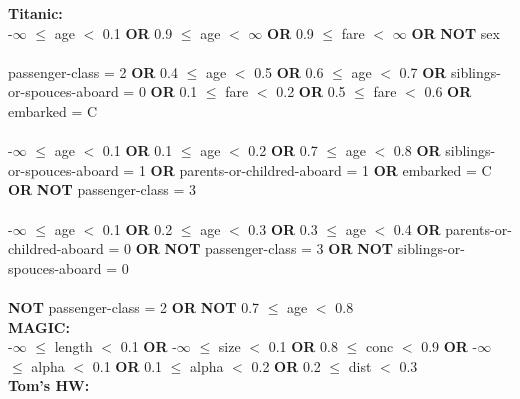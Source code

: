 \noindent \textbf{ Titanic: }\\

\noindent -$\infty$ $\le$ age $<$ 0.1 \textbf{OR} 0.9 $\le$ age $<$ $\infty$ \textbf{OR} 0.9 $\le$ fare $<$ $\infty$ \textbf{OR}  \textbf{NOT} sex \\\\passenger-class = 2 \textbf{OR} 0.4 $\le$ age $<$ 0.5 \textbf{OR} 0.6 $\le$ age $<$ 0.7 \textbf{OR} siblings-or-spouces-aboard = 0 \textbf{OR} 0.1 $\le$ fare $<$ 0.2 \textbf{OR} 0.5 $\le$ fare $<$ 0.6 \textbf{OR} embarked = C \\\\-$\infty$ $\le$ age $<$ 0.1 \textbf{OR} 0.1 $\le$ age $<$ 0.2 \textbf{OR} 0.7 $\le$ age $<$ 0.8 \textbf{OR} siblings-or-spouces-aboard = 1 \textbf{OR} parents-or-childred-aboard = 1 \textbf{OR} embarked = C \textbf{OR}  \textbf{NOT} passenger-class = 3 \\\\-$\infty$ $\le$ age $<$ 0.1 \textbf{OR} 0.2 $\le$ age $<$ 0.3 \textbf{OR} 0.3 $\le$ age $<$ 0.4 \textbf{OR} parents-or-childred-aboard = 0 \textbf{OR}  \textbf{NOT} passenger-class = 3 \textbf{OR}  \textbf{NOT} siblings-or-spouces-aboard = 0 \\\\ \textbf{NOT} passenger-class = 2 \textbf{OR}  \textbf{NOT} 0.7 $\le$ age $<$ 0.8 \\

\noindent \textbf{ MAGIC: }\\

\noindent -$\infty$ $\le$ length $<$ 0.1 \textbf{OR} -$\infty$ $\le$ size $<$ 0.1 \textbf{OR} 0.8 $\le$ conc $<$ 0.9 \textbf{OR} -$\infty$ $\le$ alpha $<$ 0.1 \textbf{OR} 0.1 $\le$ alpha $<$ 0.2 \textbf{OR} 0.2 $\le$ dist $<$ 0.3 \\

\noindent \textbf{ Tom's HW: }\\

